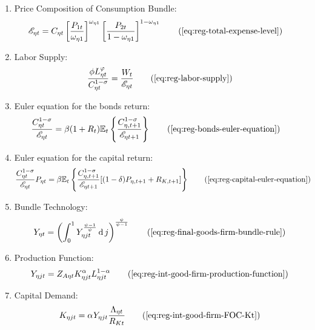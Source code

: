 \documentclass[../thesis.tex]{subfiles}
\begin{document}
{\begin{itemize}
\begin{enumerate}
		\item Price Composition of Consumption Bundle:
		\begin{align}
			\te &= C_{\eta t} \left[ \frac{P_{1 t}}{\omega_{\eta 1}} \right]^{\omega_{\eta 1}} \left[ \frac{P_{2 t}}{1 -\omega_{\eta 1}} \right]^{1 -\omega_{\eta 1}} \tag{\ref{eq:reg-total-expense-level}}
		\end{align}

		\item Labor Supply:
		\begin{align}
			\frac{\phi L_{\eta t}^{\varphi}}{C_{\eta t}^{1-\sigma}} = \frac{W_t}{\te} \tag{\ref{eq:reg-labor-supply}}
		\end{align}

		\item Euler equation for the bonds return:
		\begin{align}
			\frac{ C_{\eta t}^{1-\sigma}}{ \te} &= \beta (1 + R_{t}) \E \left\{ \frac{ C_{\eta, t+1}^{1-\sigma}}{ \te[t+1]} \right\} \tag{\ref{eq:reg-bonds-euler-equation}}
		\end{align}
		
		\item Euler equation for the capital return:
		\begin{align}
			\frac{ C_{\eta t}^{1-\sigma}}{ \te} P_{\eta t} &= \beta \mathbb{E}_t \left\{ \frac{ C_{\eta, t+1}^{1-\sigma}}{ \te[t+1]} [(1-\delta) P_{\eta, t+1} + R_{K,t+1}] \right\} \tag{\ref{eq:reg-capital-euler-equation}}
		\end{align}
					
		\item Bundle Technology:
		\begin{align}
			Y_{\eta t} = \left( \int_{0}^{1} Y_{\eta jt}^{\frac{\psi-1}{\psi}} \dif j \right)^{\frac{\psi}{\psi-1}} \tag{\ref{eq:reg-final-goods-firm-bundle-rule}}
		\end{align}
		
		\item Production Function:
		\begin{align}
			Y_{\eta jt} = Z_{A\eta t} K_{\eta jt}^{\alpha_{}} L_{\eta jt}^{1-{\alpha_{}}} \tag{\ref{eq:reg-int-good-firm-production-function}}
		\end{align}
		
		\item Capital Demand:
		\begin{align}
			K_{\eta jt} = {\alpha_{}} Y_{\eta jt} \frac{\Lambda_{\eta t}}{R_{Kt}} \tag{\ref{eq:reg-int-good-firm-FOC-Kt}}
		\end{align}
		

\end{enumerate}
\end{itemize}}
\end{document}
